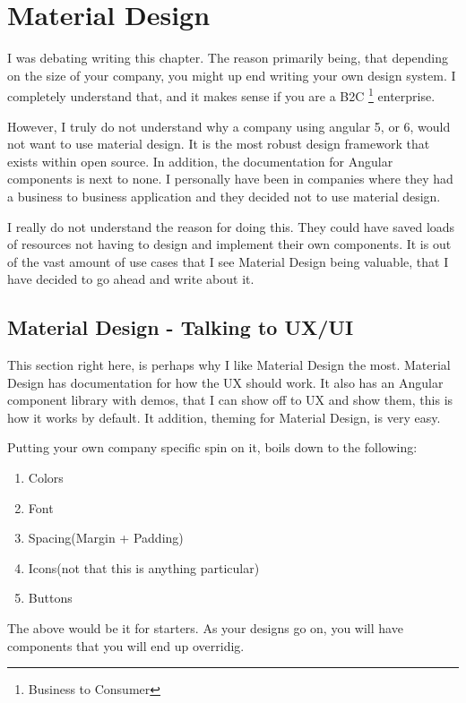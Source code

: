 \maketitle{}
\section{ Material Design }

I was debating writing this chapter. The reason primarily being, that depending
on the size of your company, you might up end writing your own design system. I
completely understand that, and it makes sense if you are a B2C
\footnote{Business to Consumer} enterprise.

However, I truly do not understand why a company using angular 5, or 6, would
not want to use material design. It is the most robust design framework that
exists within open source. In addition, the documentation for Angular components
is next to none. I personally have been in companies where they had a business
to business application and they decided not to use material design.

I really do not understand the reason for doing this. They could have saved
loads of resources not having to design and implement their own components. It
is out of the vast amount of use cases that I see Material Design being valuable,
that I have decided to go ahead and write about it.

\subsection{ Material Design - Talking to UX/UI }
This section right here, is perhaps why I like Material Design the most. Material
Design has documentation for how the UX should work. It also has an Angular
component library with demos, that I can show off to UX and show them, this is
how it works by default. It addition, theming for Material Design, is very easy.

Putting your own company specific spin on it, boils down to the following:
\begin{enumerate}
  \item Colors
  \item Font
  \item Spacing(Margin + Padding)
  \item Icons(not that this is anything particular)
  \item Buttons
\end{enumerate}

The above would be it for starters. As your designs go on, you will have components
that you will end up overridig.


